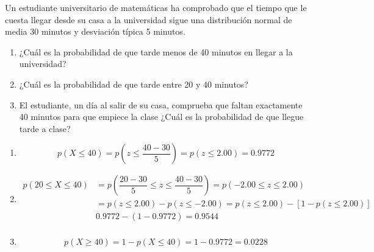 \begin{exercise}
  Un estudiante universitario de matemáticas ha comprobado que el tiempo que le cuesta llegar desde su casa a la universidad sigue una distribución normal de media 30 minutos y desviación típica 5 minutos.
  \begin{enumerate}[label=\alph* )]
  \item ¿Cuál es la probabilidad de que tarde menos de 40 minutos en llegar a la universidad?
  \item ¿Cuál es la probabilidad de que tarde entre 20 y 40 minutos?
  \item El estudiante, un día al salir de su casa, comprueba que faltan exactamente 40 minutos para que empiece la clase ¿Cuál es la probabilidad de que llegue tarde a clase?
  \end{enumerate}

  \tcblower

  \begin{enumerate}[label=\alph* )]
  \item
  \[p(X \leq 40)=p \left(z \leq  \dfrac{40-30}{5} \right) = p (z \leq 2.00)= 0.9772\]
  \item
  \begin{align*}
  p(20 \leq X \leq 40) & = p \left( \dfrac{20-30}{5} \leq z \leq \dfrac{40-30}{5} \right) = p (-2.00 \leq z \leq 2.00) \\
  & = p(z \leq 2.00)-p(z \leq -2.00)=p(z \leq 2.00)-[1-p(z \leq 2.00)] \\
  & 0.9772-(1-0.9772) = 0.9544 \\
  \end{align*}
  \item
  \[p(X \geq 40)=1-p(X \leq 40)=1-0.9772=0.0228\]
  \end{enumerate}
\end{exercise}

